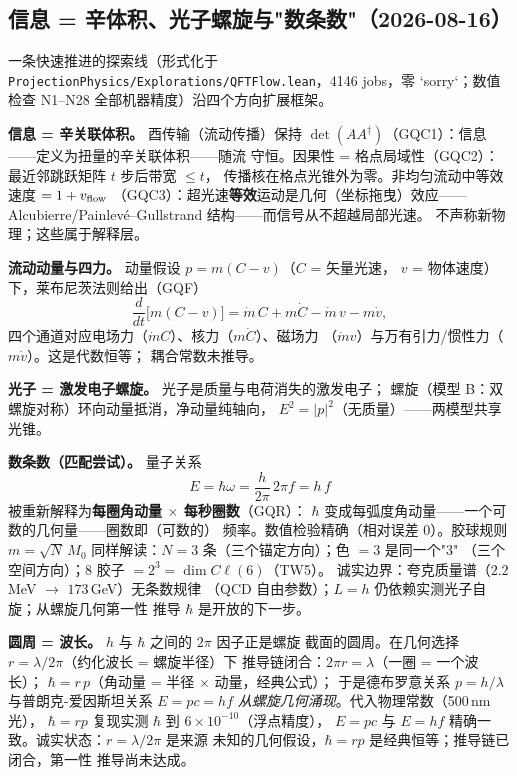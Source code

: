 \documentclass[aps,prd,preprint,superscriptaddress,amsmath,amssymb]{revtex4-2}
\begin{document}
\subsection{信息 = 辛体积、光子螺旋与"数条数"（2026-08-16）}

一条快速推进的探索线（形式化于
\texttt{ProjectionPhysics/Explorations/QFTFlow.lean}，4146 jobs，零
`sorry`；数值检查 N1--N28 全部机器精度）沿四个方向扩展框架。

\textbf{信息 = 辛关联体积。} 酉传输（流动传播）保持
$\det(AA^\dagger)$（GQC1）：信息——定义为扭量的辛关联体积——随流
守恒。因果性 = 格点局域性（GQC2）：最近邻跳跃矩阵 $t$ 步后带宽 $\le t$，
传播核在格点光锥外为零。非均匀流动中等效速度 $= 1+v_{\rm flow}$
（GQC3）：超光速\textbf{等效}运动是几何（坐标拖曳）效应——
Alcubierre/Painlev\'e--Gullstrand 结构——而信号从不超越局部光速。
不声称新物理；这些属于解释层。

\textbf{流动动量与四力。} 动量假设 $p = m(C-v)$（$C$ = 矢量光速，
$v$ = 物体速度）下，莱布尼茨法则给出（GQF）
\[
\frac{d}{dt}\big[m(C-v)\big] = \dot m\,C + m\dot C - \dot m\,v - m\dot v,
\]
四个通道对应电场力（$\dot m C$）、核力（$m\dot C$）、磁场力
（$\dot m v$）与万有引力/惯性力（$m\dot v$）。这是代数恒等；
耦合常数未推导。

\textbf{光子 = 激发电子螺旋。} 光子是质量与电荷消失的激发电子；
螺旋（模型 B：双螺旋对称）环向动量抵消，净动量纯轴向，
$E^2=|p|^2$（无质量）——两模型共享光锥。

\textbf{数条数（匹配尝试）。} 量子关系
\[
E = \hbar\omega = \frac{h}{2\pi}\,2\pi f = h\,f
\]
被重新解释为\textbf{每圈角动量 $\times$ 每秒圈数}（GQR）：
$\hbar$ 变成每弧度角动量——一个可数的几何量——圈数即（可数的）
频率。数值检验精确（相对误差 $0$）。胶球规则 $m=\sqrt{N}\,M_0$
同样解读：$N=3$ 条（三个锚定方向）；色 $=3$ 是同一个"3"
（三个空间方向）；$8$ 胶子 $= 2^3 = \dim C\ell(6)$（TW5）。
诚实边界：夸克质量谱（$2.2$\,MeV $\to$ $173$\,GeV）无条数规律
（QCD 自由参数）；$L=h$ 仍依赖实测光子自旋；从螺旋几何第一性
推导 $\hbar$ 是开放的下一步。

\textbf{圆周 = 波长。} $h$ 与 $\hbar$ 之间的 $2\pi$ 因子正是螺旋
截面的圆周。在几何选择 $r=\lambda/2\pi$（约化波长 = 螺旋半径）下
推导链闭合：$2\pi r = \lambda$（一圈 = 一个波长）；
$\hbar = r\,p$（角动量 = 半径 $\times$ 动量，经典公式）；
于是德布罗意关系 $p = h/\lambda$ 与普朗克-爱因斯坦关系
$E = pc = hf$ \emph{从螺旋几何涌现}。代入物理常数（500\,nm 光），
$\hbar = r p$ 复现实测 $\hbar$ 到 $6\times10^{-10}$（浮点精度），
$E = pc$ 与 $E = hf$ 精确一致。诚实状态：$r=\lambda/2\pi$ 是来源
未知的几何假设，$\hbar = rp$ 是经典恒等；推导链已闭合，第一性
推导尚未达成。
\end{document}
